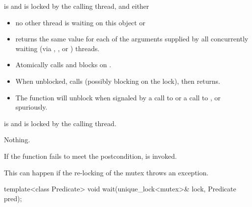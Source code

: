 \begin{itemdescr}
\pnum
\expects
{} is  and 
is locked by the calling thread, and either
\begin{itemize}
\item no other thread is waiting on this  object or
\item {} returns the same value for each of the 
arguments supplied by all concurrently waiting (via ,
, or ) threads.
\end{itemize}

\pnum
{}%
\effects
\begin{itemize}
\item Atomically calls  and blocks on .
\item When unblocked, calls  (possibly blocking on the lock), then returns.
\item The function will unblock when signaled by a call to 
or a call to , or spuriously.
\end{itemize}

\pnum
\ensures
{} is  and 
is locked by the calling thread.

\pnum
\throws
Nothing.

\pnum
\remarks
If the function fails to meet the postcondition, 
is invoked.
\begin{note}
This can happen if the re-locking of the mutex throws an exception.
\end{note}
\end{itemdescr}

%
\begin{itemdecl}
template<class Predicate>
  void wait(unique_lock<mutex>& lock, Predicate pred);
\end{itemdecl}

